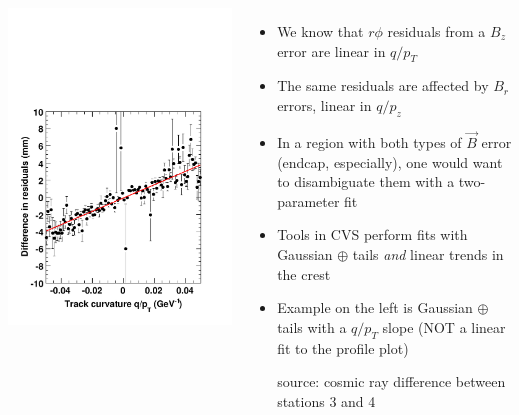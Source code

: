 \documentclass[compress]{beamer}
\begin{document}
\begin{frame}
\begin{columns}
\vspace{0.5 cm}
\includegraphics[width=\linewidth]{demo_qoverpt.pdf}
\begin{itemize}
\item We know that $r\phi$ residuals from a $B_z$ error are linear in $q/p_T$
\item The same residuals are affected by $B_r$ errors, linear in $q/p_z$
\item In a region with both types of $\vec{B}$ error (endcap,
  especially), one would want to disambiguate them with a two-parameter fit
\item Tools in CVS perform fits with Gaussian $\oplus$ tails {\it and}
  linear trends in the crest
\item Example on the left is Gaussian $\oplus$ tails with a $q/p_T$ slope (NOT a linear fit to the profile plot)

source: cosmic ray difference between stations 3 and 4

\end{itemize}
\end{columns}
\end{frame}
\end{document}
